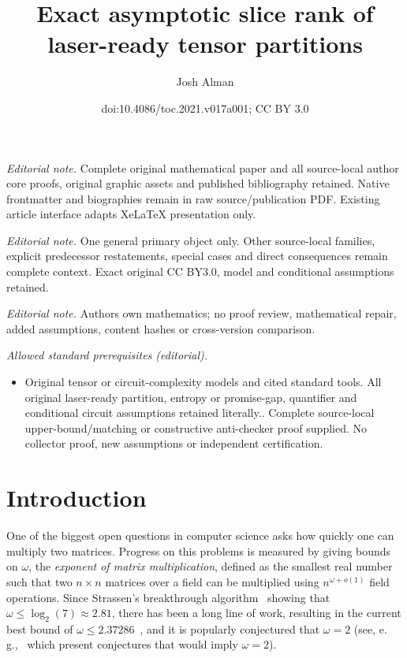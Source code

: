 \documentclass[11pt]{article}
\title{Exact asymptotic slice rank of laser-ready tensor partitions}
\author{Josh Alman}
\date{doi:10.4086/toc.2021.v017a001; CC BY 3.0}
\numberwithin{equation}{section}
\theoremstyle{definition}
\theoremstyle{plain}
\newcommand{\eg}{e.\,g.}
\theoremstyle{definition}
\begin{document}
\maketitle
\noindent\textit{Editorial note.} Complete original mathematical paper and all source-local author core proofs, original graphic assets and published bibliography retained. Native frontmatter and biographies remain in raw source/publication PDF. Existing article interface adapts XeLaTeX presentation only.\par\medskip
\noindent\textit{Editorial note.} One general primary object only. Other source-local families, explicit predecessor restatements, special cases and direct consequences remain complete context. Exact original CC BY3.0, model and conditional assumptions retained.\par\medskip
\noindent\textit{Editorial note.} Authors own mathematics; no proof review, mathematical repair, added assumptions, content hashes or cross-version comparison.\par\medskip
\noindent\textit{Allowed standard prerequisites (editorial).}\begin{itemize}
\item Original tensor or circuit-complexity models and cited standard tools. All original laser-ready partition, entropy or promise-gap, quantifier and conditional circuit assumptions retained literally.. Complete source-local upper-bound/matching or constructive anti-checker proof supplied. No collector proof, new assumptions or independent certification.
\end{itemize}\medskip
\section{Introduction}

One of the biggest open questions in computer science asks how quickly one can multiply two matrices. Progress on this problems is measured by giving bounds on $\omega$, the \emph{exponent of matrix multiplication}, defined as the smallest real number such that two $n \times n$ matrices over a field can be multiplied using $n^{\omega + o(1)}$ field operations. Since Strassen's breakthrough algorithm~\cite{strassen} showing that $\omega \leq \log_2(7) \approx 2.81$, there has been a long line of work, resulting in the current best bound of 
%
$\omega \leq 2.37286$~\cite{v12,legall,awrefined},
and it is popularly conjectured that $\omega=2$ (see, \eg,~\cite{coppersmith,cohn2005group,cohn2013fast,sunfl} which present conjectures that would imply $\omega=2$).
\end{document}
